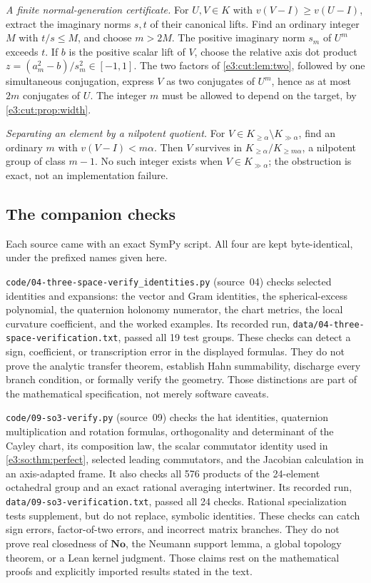 \documentclass[11pt,letterpaper]{article}
\numberwithin{equation}{section}
\theoremstyle{definition}
\theoremstyle{remark}
\newcommand{\No}{\mathbf{No}}
\begin{document}
\emph{A finite normal-generation certificate.} For $U,V\in K$ with
$v(V-I)\ge v(U-I)$, extract the imaginary norms $s,t$ of their canonical lifts.
Find an ordinary integer $M$ with $t/s\le M$, and choose $m>2M$. The positive
imaginary norm $s_m$ of $U^m$ exceeds $t$. If $b$ is the positive scalar lift of
$V$, choose the relative axis dot product $z=(a_m^2-b)/s_m^2\in[-1,1]$. The two
factors of \cref{e3:cut:lem:two}, followed by one simultaneous conjugation,
express $V$ as two conjugates of $U^m$, hence as at most $2m$ conjugates of $U$.
The integer $m$ must be allowed to depend on the target, by
\cref{e3:cut:prop:width}.

\emph{Separating an element by a nilpotent quotient.} For
$V\in K_{\ge\alpha}\setminus K_{\gg\alpha}$, find an ordinary $m$ with
$v(V-I)<m\alpha$. Then $V$ survives in $K_{\ge\alpha}/K_{\ge m\alpha}$, a
nilpotent group of class $m-1$. No such integer exists when
$V\in K_{\gg\alpha}$; the obstruction is exact, not an implementation failure.

\subsection{The companion checks}\label{e3:sub:checks}

Each source came with an exact SymPy script. All four are kept byte-identical,
under the prefixed names given here.

\texttt{code/04-three-space-verify\_identities.py} (source~04) checks selected
identities and expansions: the vector and Gram identities, the
spherical-excess polynomial, the quaternion holonomy numerator, the chart
metrics, the local curvature coefficient, and the worked examples. Its recorded
run, \texttt{data/04-three-space-verification.txt}, passed all 19 test groups.
These checks can detect a sign, coefficient, or transcription error in the
displayed formulas. They do not prove the analytic transfer theorem, establish
Hahn summability, discharge every branch condition, or formally verify the
geometry. Those distinctions are part of the mathematical specification, not
merely software caveats.

\texttt{code/09-so3-verify.py} (source~09) checks the hat identities, quaternion
multiplication and rotation formulas, orthogonality and determinant of the
Cayley chart, its composition law, the scalar commutator identity used in
\cref{e3:so:thm:perfect}, selected leading commutators, and the Jacobian
calculation in an axis-adapted frame. It also checks all 576 products of the
24-element octahedral group and an exact rational averaging intertwiner. Its
recorded run, \texttt{data/09-so3-verification.txt}, passed all 24 checks.
Rational specialization tests supplement, but do not replace, symbolic
identities. These checks can catch sign errors, factor-of-two errors, and
incorrect matrix branches. They do not prove real closedness of $\No$, the
Neumann support lemma, a global topology theorem, or a Lean kernel judgment.
Those claims rest on the mathematical proofs and explicitly imported results
stated in the text.
\end{document}
